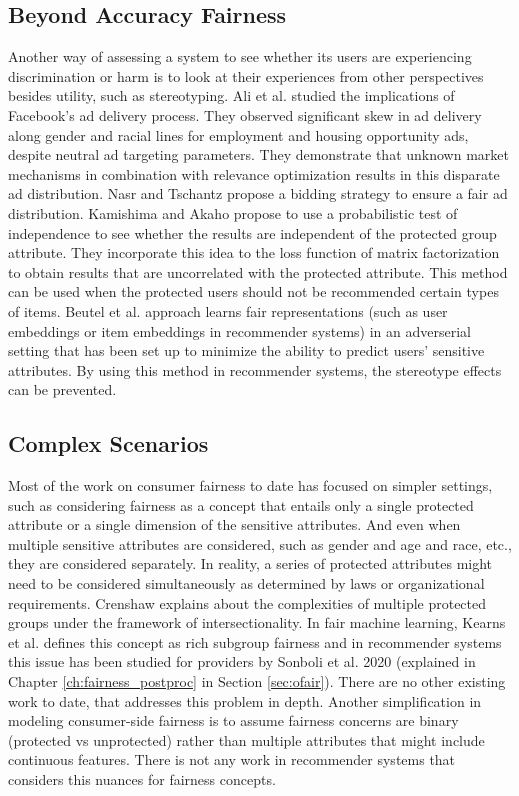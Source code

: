     \subsection{Beyond Accuracy Fairness}
    
    Another way of assessing a system to see whether its users are experiencing discrimination or harm is to look at their experiences from other perspectives besides utility, such as stereotyping. Ali et al.\cite{Ali2019Facebook} studied the implications of Facebook's ad delivery process. They observed significant skew in ad delivery along gender and racial lines for employment and housing opportunity ads, despite neutral ad targeting parameters. They demonstrate that unknown market mechanisms in combination with relevance optimization results in this disparate ad distribution. Nasr and Tschantz \cite{nasr2020bidding} propose a bidding strategy to ensure a fair ad distribution. 
    Kamishima and Akaho \cite{kamishima2017considerations, kamishima2018recommendation} propose to use a probabilistic test of independence to see whether the results are independent of the protected group attribute. They incorporate this idea to the loss function of matrix factorization to obtain results that are uncorrelated with the protected attribute. This method can be used when the protected users should not be recommended certain types of items. Beutel et al.\cite{beutel2017data} approach learns fair representations (such as user embeddings or item embeddings in recommender systems) in an adverserial setting that has been set up to minimize the ability to predict users' sensitive attributes. By using this method in recommender systems, the stereotype effects can be prevented.
    
    \subsection{Complex Scenarios}
    Most of the work on consumer fairness to date has focused on simpler settings, such as considering fairness as a concept that entails only a single protected attribute or a single dimension of the sensitive attributes. And even when multiple sensitive attributes are considered, such as gender and age and race, etc., they are considered separately. In reality, a series of protected attributes might need to be considered simultaneously as determined by laws or organizational requirements. Crenshaw \cite{crenshaw1989demarginalizing} explains about the complexities of multiple protected groups under the framework of intersectionality. In fair machine learning, Kearns et al. \cite{kearns2019empirical} defines this concept as rich subgroup fairness and in recommender systems this issue has been studied for providers by Sonboli et al. 2020 \cite{sonboli2020opportunistic}  (explained in Chapter \ref{ch:fairness_postproc} in Section \ref{sec:ofair}). There are no other existing work to date, that addresses this problem in depth. Another simplification in modeling consumer-side fairness is to assume fairness concerns are binary (protected vs unprotected) rather than multiple attributes that might include continuous features. There is not any work in recommender systems that considers this nuances for fairness concepts.


